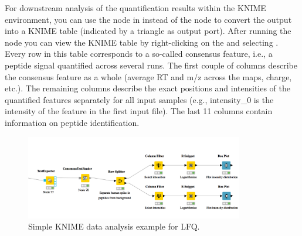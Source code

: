 For downstream analysis of the quantification results within the KNIME environment, you can use the  node in  instead of the  node to convert the output into a KNIME table (indicated by a triangle as output port). 
After running the node you can view the KNIME table by right-clicking on the  and selecting .
Every row in this table corresponds to a so-called consensus feature, i.e., a peptide signal quantified across several runs. The first couple of columns describe the consensus feature as a whole (average RT and m/z across the maps, charge, etc.). The remaining columns describe the exact positions and intensities of the quantified features separately for all input samples (e.g., intensity\_0 is the intensity of the feature in the first input file). The last 11 columns contain information on peptide identification.

\begin{figure}[htbp]
  \centering
  \includegraphics[width=0.85\textwidth]{graphics/labelfree/data_analysis.png}
  \caption{Simple KNIME data analysis example for LFQ.}
  \label{fig:lfq_data_analysis}
\end{figure}


